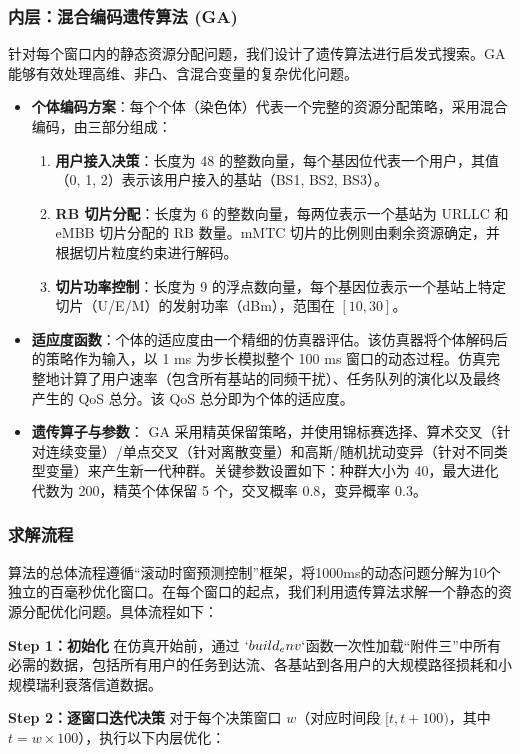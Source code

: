 \subsubsection{内层：混合编码遗传算法 (GA)}
针对每个窗口内的静态资源分配问题，我们设计了遗传算法进行启发式搜索。GA 能够有效处理高维、非凸、含混合变量的复杂优化问题。
\begin{itemize}
    \item \textbf{个体编码方案}：每个个体（染色体）代表一个完整的资源分配策略，采用混合编码，由三部分组成：
    \begin{enumerate}
        \item \textbf{用户接入决策}：长度为 48 的整数向量，每个基因位代表一个用户，其值（0, 1, 2）表示该用户接入的基站（BS1, BS2, BS3）。
        \item \textbf{RB 切片分配}：长度为 6 的整数向量，每两位表示一个基站为 URLLC 和 eMBB 切片分配的 RB 数量。mMTC 切片的比例则由剩余资源确定，并根据切片粒度约束进行解码。
        \item \textbf{切片功率控制}：长度为 9 的浮点数向量，每个基因位表示一个基站上特定切片（U/E/M）的发射功率（dBm），范围在 $[10, 30]$。
    \end{enumerate}
    \item \textbf{适应度函数}：个体的适应度由一个精细的仿真器评估。该仿真器将个体解码后的策略作为输入，以 1 ms 为步长模拟整个 100 ms 窗口的动态过程。仿真完整地计算了用户速率（包含所有基站的同频干扰）、任务队列的演化以及最终产生的 QoS 总分。该 QoS 总分即为个体的适应度。
    \item \textbf{遗传算子与参数}：
    GA 采用精英保留策略，并使用锦标赛选择、算术交叉（针对连续变量）/单点交叉（针对离散变量）和高斯/随机扰动变异（针对不同类型变量）来产生新一代种群。关键参数设置如下：种群大小为 40，最大进化代数为 200，精英个体保留 5 个，交叉概率 0.8，变异概率 0.3。
\end{itemize}

\subsubsection{求解流程}
算法的总体流程遵循“滚动时窗预测控制”框架，将1000ms的动态问题分解为10个独立的百毫秒优化窗口。在每个窗口的起点，我们利用遗传算法求解一个静态的资源分配优化问题。具体流程如下：

\textbf{Step 1：初始化}
在仿真开始前，通过 $`build_env`$函数一次性加载“附件三”中所有必需的数据，包括所有用户的任务到达流、各基站到各用户的大规模路径损耗和小规模瑞利衰落信道数据。

\textbf{Step 2：逐窗口迭代决策}
对于每个决策窗口 $w$（对应时间段 $[t, t+100)$，其中 $t = w \times 100$），执行以下内层优化：

